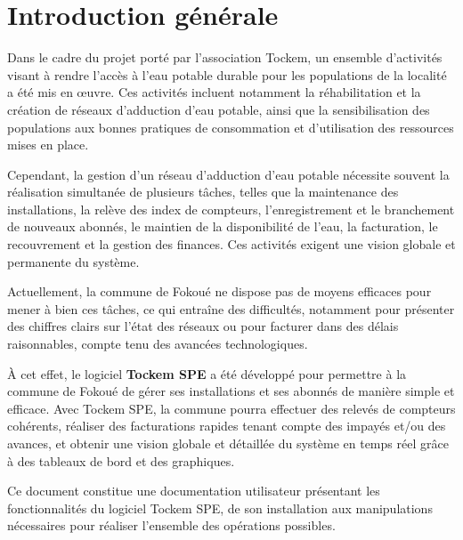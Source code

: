 \chapter*{Introduction générale}

Dans le cadre du projet porté par l'association Tockem, un ensemble d'activités visant à rendre l'accès à l'eau potable durable pour les populations de la localité a été mis en œuvre. Ces activités incluent notamment la réhabilitation et la création de réseaux d'adduction d'eau potable, ainsi que la sensibilisation des populations aux bonnes pratiques de consommation et d'utilisation des ressources mises en place.

Cependant, la gestion d'un réseau d'adduction d'eau potable nécessite souvent la réalisation simultanée de plusieurs tâches, telles que la maintenance des installations, la relève des index de compteurs, l'enregistrement et le branchement de nouveaux abonnés, le maintien de la disponibilité de l'eau, la facturation, le recouvrement et la gestion des finances. Ces activités exigent une vision globale et permanente du système.

Actuellement, la commune de Fokoué ne dispose pas de moyens efficaces pour mener à bien ces tâches, ce qui entraîne des difficultés, notamment pour présenter des chiffres clairs sur l'état des réseaux ou pour facturer dans des délais raisonnables, compte tenu des avancées technologiques.

À cet effet, le logiciel \textbf{Tockem SPE} a été développé pour permettre à la commune de Fokoué de gérer ses installations et ses abonnés de manière simple et efficace. Avec Tockem SPE, la commune pourra effectuer des relevés de compteurs cohérents, réaliser des facturations rapides tenant compte des impayés et/ou des avances, et obtenir une vision globale et détaillée du système en temps réel grâce à des tableaux de bord et des graphiques.

Ce document constitue une documentation utilisateur présentant les fonctionnalités du logiciel Tockem SPE, de son installation aux manipulations nécessaires pour réaliser l'ensemble des opérations possibles.
